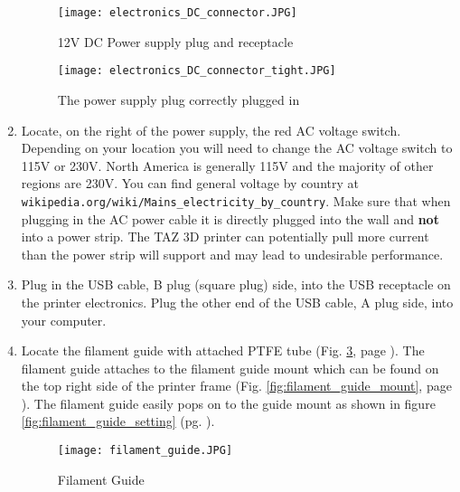\begin{enumerate}
\begin{figure}[H]
\centering
\texttt{[image: electronics\_DC\_connector.JPG]}
\caption{12V DC Power supply plug and receptacle}
\label{fig:ps_plug}
\end{figure}

\begin{figure}[H]
\centering
\texttt{[image: electronics\_DC\_connector\_tight.JPG]}
\caption{The power supply plug correctly plugged in}
\label{fig:electronics_plugs_plugged-in}
\end{figure}

\item Locate, on the right of the power supply, the red AC voltage switch. Depending on your location you will need to change the AC voltage switch to 115V or 230V. North America is generally 115V and the majority of other regions are 230V. You can find general voltage by country at \texttt{wikipedia.org/wiki/Mains\_electricity\_by\_country}. Make sure that when plugging in the AC power cable it is directly plugged into the wall and \textbf{not} into a power strip. The TAZ 3D printer can potentially pull more current than the power strip will support and may lead to undesirable performance. 

\item Plug in the USB cable, B plug (square plug) side, into the USB receptacle on the printer electronics. Plug the other end of the USB cable, A plug side, into your computer.

\item Locate the filament guide with attached PTFE tube
(Fig. \ref{fig:filament_guide}, page \pageref{fig:filament_guide}). The filament guide attaches to the filament guide mount which can be found on the top right side of the printer frame (Fig. \ref{fig:filament_guide_mount}, page \pageref{fig:filament_guide_mount}). The filament guide easily pops on to the guide mount as shown in figure \ref{fig:filament_guide_setting} (pg. \pageref{fig:filament_guide_setting}).
\begin{figure}[H]
\centering
\texttt{[image: filament\_guide.JPG]}
\caption{Filament Guide}
\label{fig:filament_guide}
\end{figure}


\end{enumerate}
